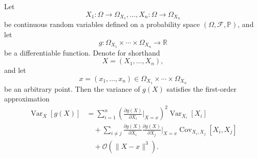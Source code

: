 \begin{theorem}
	\label{theorem:error_propagation}
	Let
	\begin{equation}
		X_1\colon\Omega \to \Omega_{X_1}, \dots, X_n\colon\Omega \to \Omega_{X_n}
	\end{equation}
	be continuous random variables defined on a probability space
	$(\Omega,\mathcal{F},\mathbb{P})$, and let
	\begin{equation}
		g\colon
		\Omega_{X_1}\times\cdots\times\Omega_{X_n}
		\to\mathbb{R}
	\end{equation}
	be a differentiable function. Denote for shorthand
	\begin{equation}
		X=(X_1,\dots,X_n),
	\end{equation}
	and let
	\begin{equation}
		x=(x_1,\dots,x_n)
		\in
		\Omega_{X_1}\times\cdots\times\Omega_{X_n}
	\end{equation}
	be an arbitrary point. Then the variance of $g(X)$ satisfies the first-order approximation
	\begin{equation}
		\begin{split}
			\operatorname{Var}_X[g(X)]
			&=
			\sum_{i=1}^n
			\left(
			\frac{\partial g(X)}{\partial X_i}
			\bigg|_{X=x}
			\right)^2
			\operatorname{Var}_{X_i}[X_i]
			\\
			&\quad+
			\sum_{i\neq j}
			\frac{\partial g(X)}{\partial X_i}
			\frac{\partial g(X)}{\partial X_j}
			\bigg|_{X=x}
			\operatorname{Cov}_{X_i,X_j}[X_i,X_j]
			\\
			&\quad+
			\mathcal{O}(\|X-x\|^3).
		\end{split}
	\end{equation}
\end{theorem}

